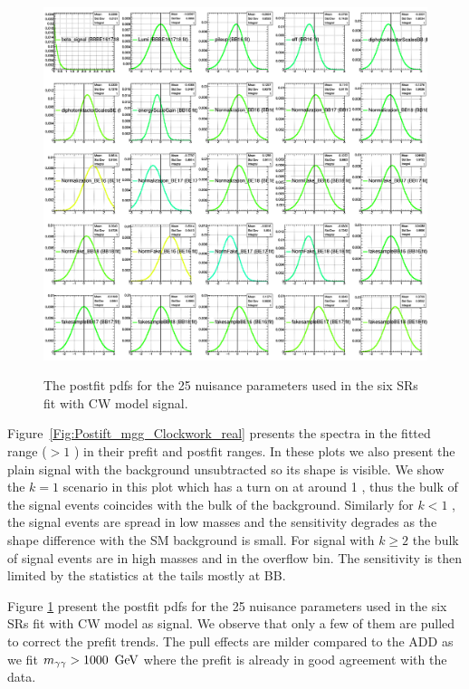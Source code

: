 \begin{figure}[!htbp]
\caption{The postfit pdfs for the 25 nuisance parameters used in the six SRs fit with CW model signal.}
\centering
\includegraphics[width=1.\linewidth]{fig/POST_All_BBBE161718_CWk_real.png}
\label{Fig:Postift_Nuisances_Clockwork_real}
\end{figure}


Figure~\ref{Fig:Postift_mgg_Clockwork_real} presents the \mgg spectra in the fitted range ($>1$ \TeV) in their prefit and postfit ranges. In these plots we also present the plain signal with the background unsubtracted so its shape is visible. We show the $k=1$ \TeV scenario in this plot which has a turn on at around 1 \TeV, thus the bulk of the signal events coincides with the bulk of the background. Similarly for $k<1$ \TeV, the signal events are spread in low masses and the sensitivity degrades as the shape difference with the SM background is small. For signal with $k\ge2$ \TeV the bulk of signal events are in high masses and in the overflow \mgg bin. The sensitivity is then limited by the statistics at the tails mostly at BB.

Figure \ref{Fig:Postift_Nuisances_Clockwork_real} present the postfit pdfs for the 25 nuisance parameters used in the six SRs fit with CW model as signal.
We observe that only a few of them are pulled to correct the prefit trends.
The pull effects are milder compared to the ADD as we fit $m_{\gamma\gamma}>1000~\,\text{Ge\hspace{-.08em}V}$ where the prefit is already in good agreement with the data.

